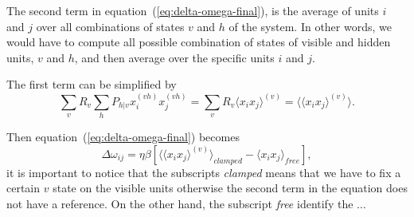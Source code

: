 The second term in equation~(\ref{eq:delta-omega-final}), is the average of units $i$ and $j$ over all combinations of states $v$ and $h$ of the system.
In other words, we would have to compute all possible combination of states of visible and hidden units, $v$ and $h$, and then average over the specific units $i$ and $j$.

The first term can be simplified by
\begin{equation}
  \sum_{v} R_{v} \sum_{h} P_{h|v} x^{(vh)}_{i} x^{(vh)}_{j} = \sum_{v} R_{v} \langle x_{i} x_{j} \rangle^{(v)} = \langle \langle x_{i} x_{j} \rangle^{(v)} \rangle.
  \label{eq:clamped_term}
\end{equation}

Then equation~(\ref{eq:delta-omega-final}) becomes
\begin{equation}
  \label{eq:delta-omega-final2}
  \Delta \omega_{ij} = \eta \beta \left[ \langle \langle x_{i} x_{j} \rangle^{(v)} \rangle_{clamped} - \langle x_{i} x_{j} \rangle_{free} \right],
\end{equation}
it is important to notice that the subscripts \textit{clamped} means that we have to fix a certain $v$ state on the visible units otherwise the second term in the equation does not have a reference.
On the other hand, the subscript \textit{free} identify the $\ldots$
